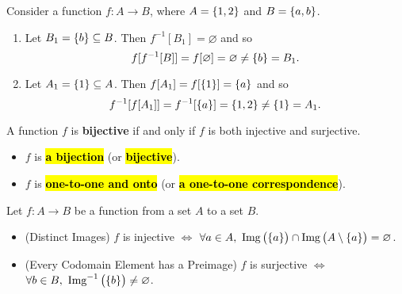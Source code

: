 \documentclass[11pt,openany]{article}
\begin{document}
\begin{example*}[Counterexample]
	Consider a function $f:A\to B$, where $A=\set{1,2}$ and $B=\set{a,b}$.
	\begin{center}
	
	\end{center}
	\begin{enumerate}[(1)]
		\item Let $B_1=\set{b}\subseteq B$. Then $f^{-1}[B_1]=\varnothing$ and so \[
		f[f^{-1}[B]]=f[\varnothing]=\varnothing\neq \set{b}=B_1.
		\]
		\item Let $A_1=\set{1}\subseteq A$. Then $f[A_1]=f[\set{1}]=\set{a}$ and so \[
		f^{-1}[f[A_1]]=f^{-1}[\set{a}]=\set{1,2}\neq \set{1}=A_1.
		\]
	\end{enumerate}
\end{example*}
\vfill
{}
\begin{remark*}
	A function $f$ is \textbf{bijective} if and only if $f$ is both injective and surjective.
	\begin{itemize}
		\item $f$ is \hl{\textbf{a bijection}} (or \hl{\textbf{bijective}}).
		\item $f$ is \hl{\textbf{one-to-one and onto}} (or \hl{\textbf{a one-to-one correspondence}}).
	\end{itemize}
\end{remark*}
\begin{remark*}
Let $f:A\to B$ be a function from a set $A$ to a set $B$. \begin{itemize}
	\item (Distinct Images) $f$ is injective $\iff$ $\forall a\in A,\ \Img{\set{a}}\cap\Img{A\setminus\set{a}}=\varnothing$.
	\item (Every Codomain Element has a Preimage) $f$ is surjective $\iff$ $\forall b\in B,\ \Preimg{\set{b}}\neq\varnothing$.
\end{itemize}
\end{remark*}
\end{document}
